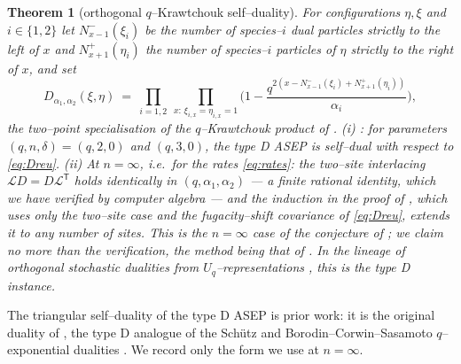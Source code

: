 \documentclass[11pt]{article}
\theoremstyle{plain}
\newtheorem{theorem}{Theorem}[section]
\theoremstyle{definition}
\theoremstyle{remark}
\newcommand{\cL}{\mathcal L}\newcommand{\cO}{\mathcal O}\newcommand{\cE}{\mathcal E}
\begin{document}
\begin{theorem}[orthogonal $q$--Krawtchouk self--duality]\label{thm:dual}
For configurations $\eta,\xi$ and $i\in\{1,2\}$ let $N^-_{x-1}(\xi_i)$ be the number
of species--$i$ dual particles strictly to the left of $x$ and $N^+_{x+1}(\eta_i)$
the number of species--$i$ particles of $\eta$ strictly to the right of $x$, and set
\begin{equation}\label{eq:Dreu}
  D_{\alpha_1,\alpha_2}(\xi,\eta)\ =\ \prod_{i=1,2}\ \prod_{x:\,\xi_{i,x}=\eta_{i,x}=1}
  \Big(1-\frac{q^{2\left(x-N^-_{x-1}(\xi_i)+N^+_{x+1}(\eta_i)\right)}}{\alpha_i}\Big),
\end{equation}
the two--point specialisation of the $q$--Krawtchouk product of
\cite[Thm.~3.1]{REU}.
\textup{(i)} \cite[Thm.~3.1]{REU}: for parameters $(q,n,\delta)=(q,2,0)$ and
$(q,3,0)$, the type D ASEP is self--dual with respect to \eqref{eq:Dreu}.
\textup{(ii)} At $n=\infty$, i.e.\ for the rates \eqref{eq:rates}: the two--site
interlacing $\cL D=D\cL^{\mathsf T}$ holds identically in $(q,\alpha_1,\alpha_2)$ ---
a finite rational identity, which we have verified by computer algebra --- and the
induction in the proof of \cite[Thm.~3.1, eqs.~(16)--(19)]{REU}, which uses only the
two--site case and the fugacity--shift covariance of \eqref{eq:Dreu}, extends it to
any number of sites. This is the $n=\infty$ case of the conjecture of
\cite[Rmk.~4]{REU}; we claim no more than the verification, the method being that of
\cite{REU}. In the lineage of orthogonal stochastic dualities from
$U_q$--representations \cite{Groenevelt,CGRS}, this is the type D instance.
\end{theorem}

The triangular self--duality of the type D ASEP is prior work: it is the original
duality of \cite{KLLPZ}, the type D analogue of the Sch\"utz and
Borodin--Corwin--Sasamoto $q$--exponential dualities \cite{SchutzDual,BCS}. We record
only the form we use at $n=\infty$.
\end{document}

